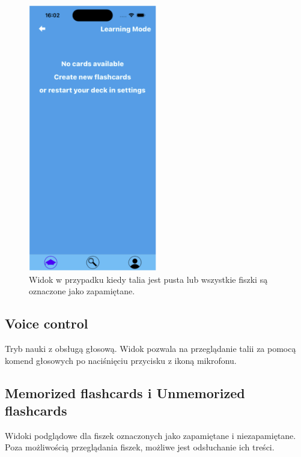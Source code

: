\begin{figure}[H]
    \centering
    \includegraphics[width=0.5\textwidth]{chapters/chapter_10/images_mobile/mobile_learn_2}
    \caption{Widok w przypadku kiedy talia jest pusta lub wszystkie fiszki są oznaczone jako zapamiętane.}
    \label{img:mobile_learn_2}
\end{figure}


\subsection{Voice control}
Tryb nauki z obsługą głosową. Widok pozwala na przeglądanie talii za pomocą komend głosowych po naciśnięciu przycisku z ikoną mikrofonu.


\subsection{Memorized flashcards i Unmemorized flashcards}
Widoki podglądowe dla fiszek oznaczonych jako zapamiętane i niezapamiętane. Poza możliwością przeglądania fiszek, możliwe jest odsłuchanie ich treści.


